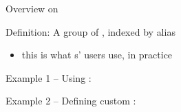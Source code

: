 \documentclass[handout]{beamer}
\begin{document}
\begin{frame}[allowframebreaks]{Overview on }
    \framebreak

    \begin{block}{Definition: }
        A group of , indexed by \alert{alias}
    \end{block}
    \begin{itemize}
        \item this is what s' users use, in practice
    \end{itemize}

    \framebreak

    Example 1 -- Using :

    \framebreak

    Example 2 -- Defining custom :

\end{frame}
\end{document}
